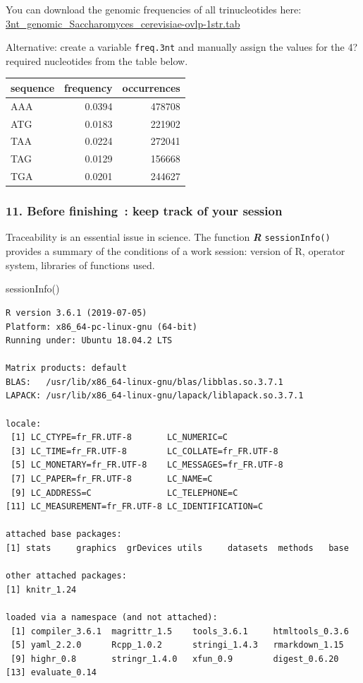 \documentclass[]{article}
\newenvironment{Shaded}{\begin{snugshade}}{\end{snugshade}}
\newcommand{\KeywordTok}[1]{\textcolor[rgb]{0.94,0.87,0.69}{#1}}
\newcommand{\NormalTok}[1]{\textcolor[rgb]{0.80,0.80,0.80}{#1}}
\begin{document}
You can download the genomic frequencies of all trinucleotides here:
\href{http://jvanheld.github.io/stat1/data/Saccharomyces_cerevisiae/oligo_freq/3nt_genomic_Saccharomyces_cerevisiae-ovlp-1str.tab}{3nt\_genomic\_Saccharomyces\_cerevisiae-ovlp-1str.tab}

Alternative: create a variable \texttt{freq.3nt} and manually assign the
values for the 4? required nucleotides from the table below.

\begin{longtable}[]{@{}lrr@{}}
\toprule
sequence & frequency & occurrences\tabularnewline
\midrule
\endhead
AAA & 0.0394 & 478708\tabularnewline
ATG & 0.0183 & 221902\tabularnewline
TAA & 0.0224 & 272041\tabularnewline
TAG & 0.0129 & 156668\tabularnewline
TGA & 0.0201 & 244627\tabularnewline
\bottomrule
\end{longtable}

\subsubsection{11. Before finishing~: keep track of your
session}\label{before-finishing-keep-track-of-your-session}

Traceability is an essential issue in science. The function
\textbf{\emph{R}} \texttt{sessionInfo()} provides a summary of the
conditions of a work session: version of R, operator system, libraries
of functions used.

\begin{Shaded}
\begin{Highlighting}[]
\KeywordTok{sessionInfo}\NormalTok{()}
\end{Highlighting}
\end{Shaded}

\begin{verbatim}
R version 3.6.1 (2019-07-05)
Platform: x86_64-pc-linux-gnu (64-bit)
Running under: Ubuntu 18.04.2 LTS

Matrix products: default
BLAS:   /usr/lib/x86_64-linux-gnu/blas/libblas.so.3.7.1
LAPACK: /usr/lib/x86_64-linux-gnu/lapack/liblapack.so.3.7.1

locale:
 [1] LC_CTYPE=fr_FR.UTF-8       LC_NUMERIC=C              
 [3] LC_TIME=fr_FR.UTF-8        LC_COLLATE=fr_FR.UTF-8    
 [5] LC_MONETARY=fr_FR.UTF-8    LC_MESSAGES=fr_FR.UTF-8   
 [7] LC_PAPER=fr_FR.UTF-8       LC_NAME=C                 
 [9] LC_ADDRESS=C               LC_TELEPHONE=C            
[11] LC_MEASUREMENT=fr_FR.UTF-8 LC_IDENTIFICATION=C       

attached base packages:
[1] stats     graphics  grDevices utils     datasets  methods   base     

other attached packages:
[1] knitr_1.24

loaded via a namespace (and not attached):
 [1] compiler_3.6.1  magrittr_1.5    tools_3.6.1     htmltools_0.3.6
 [5] yaml_2.2.0      Rcpp_1.0.2      stringi_1.4.3   rmarkdown_1.15 
 [9] highr_0.8       stringr_1.4.0   xfun_0.9        digest_0.6.20  
[13] evaluate_0.14  
\end{verbatim}
\end{document}
